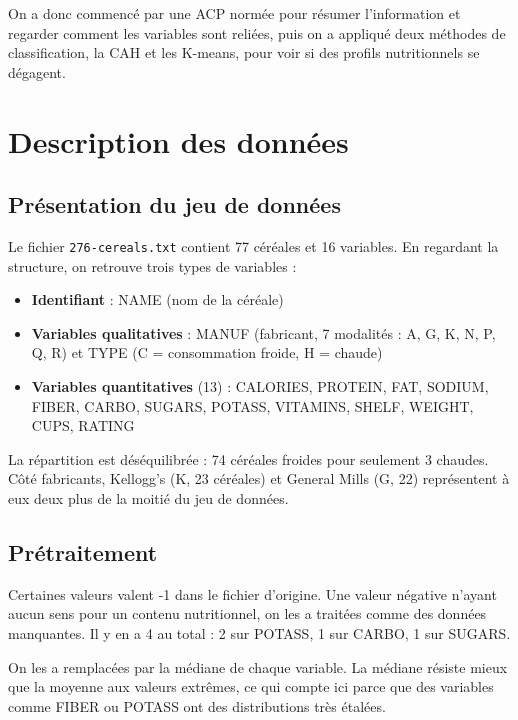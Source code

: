 \documentclass[
]{article}
\providecommand{\tightlist}{%
  \setlength{\itemsep}{0pt}\setlength{\parskip}{0pt}}
\begin{document}
On a donc commencé par une ACP normée pour résumer l'information et
regarder comment les variables sont reliées, puis on a appliqué deux
méthodes de classification, la CAH et les K-means, pour voir si des
profils nutritionnels se dégagent.

\section{Description des données}\label{description-des-donnuxe9es}

\subsection{Présentation du jeu de
données}\label{presentation-du-jeu-de-donnuxe9es}

Le fichier \texttt{276-cereals.txt} contient 77 céréales et 16
variables. En regardant la structure, on retrouve trois types de
variables :

\begin{itemize}
\tightlist
\item
  \textbf{Identifiant} : NAME (nom de la céréale)
\item
  \textbf{Variables qualitatives} : MANUF (fabricant, 7 modalités : A,
  G, K, N, P, Q, R) et TYPE (C = consommation froide, H = chaude)
\item
  \textbf{Variables quantitatives} (13) : CALORIES, PROTEIN, FAT,
  SODIUM, FIBER, CARBO, SUGARS, POTASS, VITAMINS, SHELF, WEIGHT, CUPS,
  RATING
\end{itemize}

La répartition est déséquilibrée : 74 céréales froides pour seulement 3
chaudes. Côté fabricants, Kellogg's (K, 23 céréales) et General Mills
(G, 22) représentent à eux deux plus de la moitié du jeu de données.

\subsection{Prétraitement}\label{pretraitement}

Certaines valeurs valent -1 dans le fichier d'origine. Une valeur
négative n'ayant aucun sens pour un contenu nutritionnel, on les a
traitées comme des données manquantes. Il y en a 4 au total : 2 sur
POTASS, 1 sur CARBO, 1 sur SUGARS.

On les a remplacées par la médiane de chaque variable. La médiane
résiste mieux que la moyenne aux valeurs extrêmes, ce qui compte ici
parce que des variables comme FIBER ou POTASS ont des distributions très
étalées.
\end{document}
